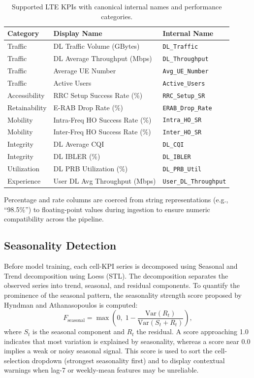 \begin{table}[htbp]
    \centering
    \caption{Supported LTE KPIs with canonical internal names and performance categories.}
    \label{tab:kpis}
    \begin{tabular}{@{}lll@{}}
        \toprule
        \textbf{Category} & \textbf{Display Name} & \textbf{Internal Name} \\
        \midrule
        Traffic & DL Traffic Volume (GBytes) & \texttt{DL\_Traffic} \\
        Traffic & DL Average Throughput (Mbps) & \texttt{DL\_Throughput} \\
        Traffic & Average UE Number & \texttt{Avg\_UE\_Number} \\
        Traffic & Active Users & \texttt{Active\_Users} \\
        Accessibility & RRC Setup Success Rate (\%) & \texttt{RRC\_Setup\_SR} \\
        Retainability & E-RAB Drop Rate (\%) & \texttt{ERAB\_Drop\_Rate} \\
        Mobility & Intra-Freq HO Success Rate (\%) & \texttt{Intra\_HO\_SR} \\
        Mobility & Inter-Freq HO Success Rate (\%) & \texttt{Inter\_HO\_SR} \\
        Integrity & DL Average CQI & \texttt{DL\_CQI} \\
        Integrity & DL IBLER (\%) & \texttt{DL\_IBLER} \\
        Utilization & DL PRB Utilization (\%) & \texttt{DL\_PRB\_Util} \\
        Experience & User DL Avg Throughput (Mbps) & \texttt{User\_DL\_Throughput} \\
        \bottomrule
    \end{tabular}
\end{table}

Percentage and rate columns are coerced from string representations (e.g., ``98.5\%'') to floating-point values during ingestion to ensure numeric compatibility across the pipeline.

\subsection{Seasonality Detection}

Before model training, each cell-KPI series is decomposed using Seasonal and Trend decomposition using Loess (STL). The decomposition separates the observed series into trend, seasonal, and residual components. To quantify the prominence of the seasonal pattern, the seasonality strength score proposed by Hyndman and Athanasopoulos is computed:
\begin{equation}
F_{\text{seasonal}} = \max\left(0,\; 1 - \frac{\text{Var}(R_t)}{\text{Var}(S_t + R_t)}\right),
\label{eq:seasonality_strength}
\end{equation}
where $S_t$ is the seasonal component and $R_t$ the residual. A score approaching 1.0 indicates that most variation is explained by seasonality, whereas a score near 0.0 implies a weak or noisy seasonal signal. This score is used to sort the cell-selection dropdown (strongest seasonality first) and to display contextual warnings when lag-7 or weekly-mean features may be unreliable.

